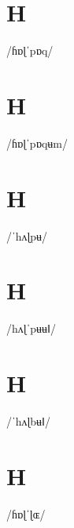 \documentclass[10pt,a4paper,twoside]{book}
\begin{document}
\section*{H}

\begin{multicols}{3}
 {/ɦɒɭˈpɒq/} {}
\end{multicols}

\section*{H}

\begin{multicols}{3}
 {/ɦɒɭˈpɒqʉm/} {}
\end{multicols}

\section*{H}

\begin{multicols}{3}
 {/ˈhʌɭpʉ/} {}
\end{multicols}

\section*{H}

\begin{multicols}{3}
 {/hʌɭˈpʉʉǁ/} {}
\end{multicols}

\section*{H}

\begin{multicols}{3}
 {/ˈhʌɭbʉǁ/} {}
\end{multicols}

\section*{H}

\begin{multicols}{3}
 {/ɦɒɭˈɭɶ/} {}
\end{multicols}
\end{document}
